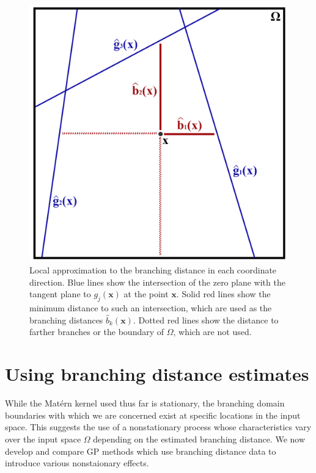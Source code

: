 \documentclass{article}
\renewcommand{\vec}[1]{\mathbf{#1}}
\numberwithin{equation}{section}
\begin{document}
\begin{figure}
		\centering
		\captionsetup{justification=centering}
		\includegraphics[scale=0.7]{figures/branch-approx.png}
		\caption{Local approximation to the branching distance in each coordinate direction. Blue lines show the intersection of the zero plane with the tangent plane to $g_j(\vec{x})$ at the point $\vec{x}$. Solid red lines show the minimum distance to such an intersection, which are used as the branching distances $\hat{b}_k(\vec{x})$. Dotted red lines show the distance to farther branches or the boundary of $\Omega$, which are not used.}
		\label{branch}
\end{figure}

\section{Using branching distance estimates} \label{using_branch}
While the Mat\'ern kernel used thus far is stationary, the branching domain boundaries with which we are concerned exist at specific locations in the input space. This suggests the use of a nonstationary process whose characteristics vary over the input space $\Omega$ depending on the estimated branching distance. We now develop and compare GP methods which use branching distance data to introduce various nonstaionary effects.
\end{document}
